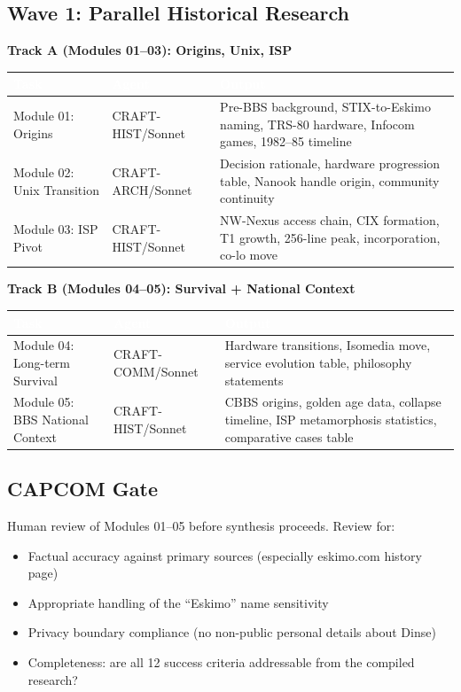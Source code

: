 \documentclass[11pt,letterpaper]{article}
\newcommand{\tableheader}[1]{\textbf{\sffamily\textcolor{white}{#1}}}
\begin{document}
\subsection{Wave 1: Parallel Historical Research}

\textbf{Track A (Modules 01--03): Origins, Unix, ISP}

\begin{center}
\begin{tabularx}{\textwidth}{L{3cm}L{2.5cm}X}
\toprule
{}
\tableheader{Task} & \tableheader{Agent} & \tableheader{Output} \\
\midrule
Module 01: Origins & CRAFT-HIST/Sonnet & Pre-BBS background, STIX-to-Eskimo naming, TRS-80 hardware, Infocom games, 1982--85 timeline \\
Module 02: Unix Transition & CRAFT-ARCH/Sonnet & Decision rationale, hardware progression table, Nanook handle origin, community continuity \\
Module 03: ISP Pivot & CRAFT-HIST/Sonnet & NW-Nexus access chain, CIX formation, T1 growth, 256-line peak, incorporation, co-lo move \\
\bottomrule
\end{tabularx}
\end{center}

\textbf{Track B (Modules 04--05): Survival + National Context}

\begin{center}
\begin{tabularx}{\textwidth}{L{3cm}L{2.5cm}X}
\toprule
{}
\tableheader{Task} & \tableheader{Agent} & \tableheader{Output} \\
\midrule
Module 04: Long-term Survival & CRAFT-COMM/Sonnet & Hardware transitions, Isomedia move, service evolution table, philosophy statements \\
Module 05: BBS National Context & CRAFT-HIST/Sonnet & CBBS origins, golden age data, collapse timeline, ISP metamorphosis statistics, comparative cases table \\
\bottomrule
\end{tabularx}
\end{center}

\subsection{CAPCOM Gate}

Human review of Modules 01--05 before synthesis proceeds. Review for:
\begin{itemize}[leftmargin=1.5em]
  \item Factual accuracy against primary sources (especially eskimo.com history page)
  \item Appropriate handling of the ``Eskimo'' name sensitivity
  \item Privacy boundary compliance (no non-public personal details about Dinse)
  \item Completeness: are all 12 success criteria addressable from the compiled research?
\end{itemize}
\end{document}
